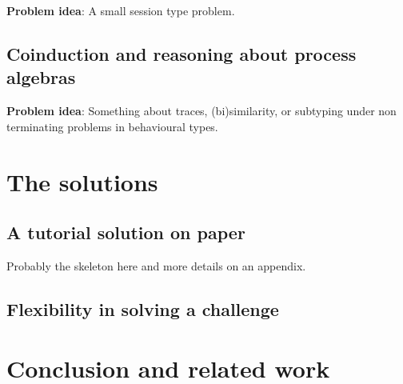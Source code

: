 \documentclass{jfp}
\begin{document}
\textbf{Problem idea}: A small session type problem.

\subsection{Coinduction and reasoning about process algebras}

\textbf{Problem idea}: Something about traces, (bi)similarity, or
subtyping under non terminating problems in behavioural types.

\section{The solutions}\label{sec:solutions}

\subsection{A tutorial solution on paper}\label{sec:tutorial}

Probably the skeleton here and more details on an appendix.

\subsection{Flexibility in solving a challenge}

\section{Conclusion and related work} \label{sec:conclusion}




\label{lastpage01}
\end{document}
